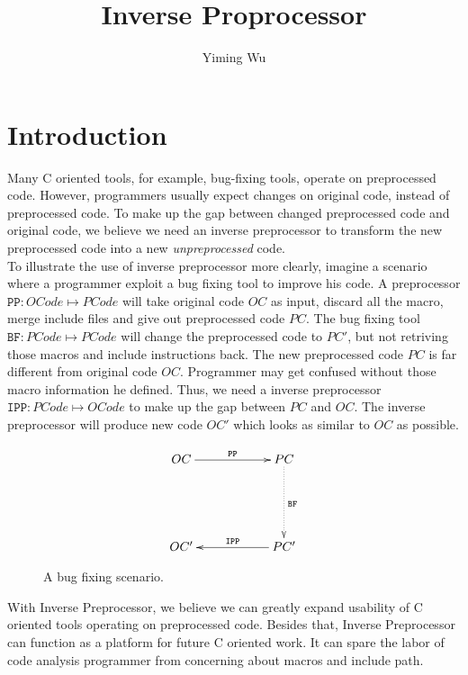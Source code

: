 \documentclass[11pt]{article}
\title{Inverse Proprocessor}
\author{Yiming Wu}
\theoremstyle{theorem}
\theoremstyle{lemma}
\theoremstyle{property}
\theoremstyle{definition}
\theoremstyle{assumption}
\begin{document}
\maketitle

\section{Introduction}

Many C oriented tools, for example, bug-fixing tools, operate on preprocessed code. 
However, programmers usually expect changes on original code, instead of preprocessed code. 
To make up the gap between changed preprocessed code and original code, we believe we need an inverse preprocessor to transform the new preprocessed code into a new \textsl{unpreprocessed} code. \\

To illustrate the use of inverse preprocessor more clearly, imagine a scenario where a programmer exploit a bug fixing tool to improve his code. 
A preprocessor $\mathtt{PP}: OCode \mapsto PCode$ will take original code $OC$ as input, discard all the macro, merge include files and give out preprocessed code $PC$. 
The bug fixing tool $\mathtt{BF} : PCode \mapsto PCode$ will change the preprocessed code to $PC'$, but not retriving those macros and include instructions back.
The new preprocessed code $PC$ is far different from original code $OC$.
Programmer may get confused without those macro information he defined.
Thus, we need a inverse preprocessor $\mathtt{IPP}: PCode \mapsto OCode$ to make up the gap between $PC$ and $OC$.
The inverse preprocessor will produce new code $OC'$ which looks as similar to $OC$ as possible.
\begin{figure}[H]
\begin{displaymath}
    \xymatrix@=2cm{
    OC \ar@{->}[r]^{\mathtt{PP}}
    & PC\ar@{..>}[d]^{\mathtt{BF}}
    \\
    OC'\ar@{<-}[r]^{\mathtt{IPP}}
    & PC'
    }
\end{displaymath}
\caption{A bug fixing scenario.}
\end{figure}

With Inverse Preprocessor, we believe we can greatly expand usability of C oriented tools operating on preprocessed code. Besides that, Inverse Preprocessor can function as a platform for future C oriented work. It can spare the labor of code analysis programmer from concerning about macros and include path.
\end{document}
